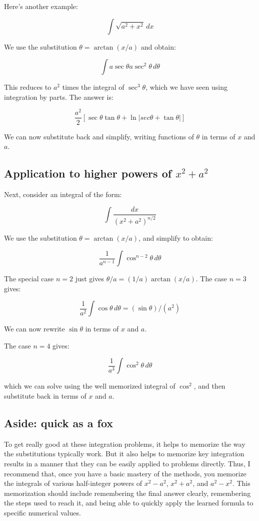 \documentclass[10pt]{amsart}
\begin{document}
Here's another example:

$$ \int \sqrt{a^2 + x^2} \, dx$$

We use the substitution $\theta = \arctan(x/a)$ and obtain:

$$\int a\sec \theta a \sec^2 \theta \, d\theta$$

This reduces to $a^2$ times the integral of $\sec^3 \theta$, which we
have seen using integration by parts. The answer is:

$$\frac{a^2}{2} \left[ \sec \theta \tan \theta + \ln|sec \theta + \tan \theta|\right]$$

We can now substitute back and simplify, writing functions of $\theta$
in terms of $x$ and $a$.

\subsection{Application to higher powers of $x^2 + a^2$}

Next, consider an integral of the form:

$$\int \frac{dx}{(x^2 + a^2)^{n/2}}$$

We use the substitution $\theta = \arctan(x/a)$, and simplify to obtain:

$$\frac{1}{a^{n - 1}} \int \cos^{n - 2} \theta \, d\theta$$

The special case $n = 2$ just gives $\theta/a = (1/a)
\arctan(x/a)$. The case $n = 3$ gives:

$$\frac{1}{a^2} \int \cos \theta \, d\theta = (\sin \theta)/(a^2)$$

We can now rewrite $\sin \theta$ in terms of $x$ and $a$.

The case $n = 4$ gives:

$$\frac{1}{a^3} \int \cos^2 \theta \, d\theta$$

which we can solve using the well memorized integral of $\cos^2$, and
then substitute back in terms of $x$ and $a$.

\subsection*{Aside: quick as a fox}

To get really good at these integration problems, it helps to memorize
the way the substitutions typically work. But it also helps to
memorize key integration results in a manner that they can be easily
applied to problems directly. Thus, I recommend that, once you have a
basic mastery of the methods, you memorize the integrals of various
half-integer powers of $x^2 - a^2$, $x^2 + a^2$, and $a^2 - x^2$. This
memorization should include remembering the final answer clearly,
remembering the steps used to reach it, and being able to quickly
apply the learned formula to specific numerical values.
\end{document}
